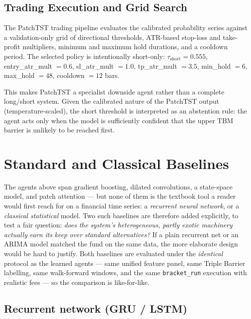 \subsection{Trading Execution and Grid Search}

The PatchTST trading pipeline evaluates the calibrated probability series against a validation-only grid of directional thresholds, ATR-based stop-loss and take-profit multipliers, minimum and maximum hold durations, and a cooldown period. The selected policy is intentionally short-only: $\tau_{\text{short}}=0.555$, entry\_atr\_mult $=0.6$, sl\_atr\_mult $=1.0$, tp\_atr\_mult $=3.5$, min\_hold $=6$, max\_hold $=48$, cooldown $=12$ bars.


This makes PatchTST a specialist downside agent rather than a complete long/short system. Given the calibrated nature of the PatchTST output (temperature-scaled), the short threshold is interpreted as an abstention rule: the agent acts only when the model is sufficiently confident that the upper TBM barrier is unlikely to be reached first.

\section{Standard and Classical Baselines}
\label{sec:standard_baselines}

The agents above span gradient boosting, dilated convolutions, a state-space model, and patch attention --- but none of them is the textbook tool a reader would first reach for on a financial time series: a \textit{recurrent neural network}, or a \textit{classical statistical} model. Two such baselines are therefore added explicitly, to test a fair question: \textit{does the system's heterogeneous, partly exotic machinery actually earn its keep over standard alternatives?} If a plain recurrent net or an ARIMA model matched the fund on the same data, the more elaborate design would be hard to justify. Both baselines are evaluated under the \textit{identical} protocol as the learned agents --- same unified feature panel, same Triple Barrier labelling, same walk-forward windows, and the same \texttt{bracket\_run} execution with realistic fees --- so the comparison is like-for-like.

\subsection{Recurrent network (GRU / LSTM)}
\label{sec:rnn_baseline}

